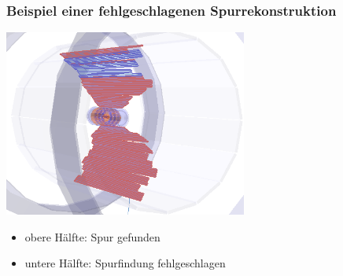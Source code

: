\documentclass[18pt]{beamer}
\begin{document}
\begin{frame}
  \begin{center}
    \frametitle{Beispiel einer fehlgeschlagenen Spurrekonstruktion}    
   \includegraphics[width=0.6\textwidth]{figures/b2display_screenshots/gcr_data_2017-08_run3902_evt13913_finding-fail-musterevent_3d_cropped.png}
    \begin{itemize}
    \item obere Hälfte: \textcolor{kit-blue100}{Spur gefunden}
    \item untere Hälfte: \textcolor{kit-red100}{Spurfindung fehlgeschlagen}
    \end{itemize}

  \end{center}
\end{frame}
\end{document}
